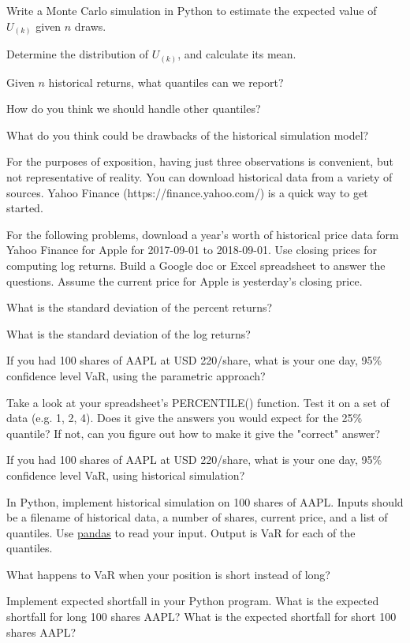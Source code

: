 \documentclass{report}
\numberwithin{problem}{chapter} %
\let\oldroblem\problem
\renewcommand{\problem}{ \oldroblem  \normalfont}
\newcommand{\vs}{\vspace}
\begin{document}
\problem Write a Monte Carlo simulation in Python to estimate the expected value of  $U_{(k)}$ given $n$ draws. 

\problem Determine the distribution of $U_{(k)}$, and calculate its mean. 

\problem Given $n$ historical returns, what quantiles can we report? 

\problem How do you think we should handle other quantiles?

\problem What do you think could be drawbacks of the historical simulation model?
\vs{3mm}

For the purposes of exposition, having just three observations is convenient, but not representative of reality. You can download historical data from a variety of sources. Yahoo Finance (https://finance.yahoo.com/) is a quick way to get started. 

For the following problems, download a year's worth of historical price data form Yahoo Finance for Apple for 2017-09-01 to 2018-09-01. Use closing prices for computing log returns.  Build a Google doc or Excel spreadsheet to answer the questions. Assume the current price for Apple is yesterday's closing price. 

\problem What is the standard deviation of the percent returns?

\problem What is the standard deviation of the log returns?

\problem If you had 100 shares of AAPL at USD 220/share, what is your one day, 95\% confidence level VaR, using the parametric approach?

\problem Take a look at your spreadsheet's PERCENTILE() function. Test it on a set of data (e.g. {1, 2, 4}). Does it give the answers you would expect for the 25\% quantile? If not, can you figure out how to make it give the "correct" answer?

\problem If you had 100 shares of AAPL at USD 220/share, what is your one day, 95\% confidence level VaR, using  historical simulation?

\problem In Python, implement historical simulation on 100 shares of AAPL. Inputs should be a filename of historical data, a number of shares, current price, and a list of quantiles. Use  \href{https://www.shanelynn.ie/python-pandas-read_csv-load-data-from-csv-files}{pandas} to read your input. Output is VaR for each of the quantiles. 

\problem What happens to VaR when your position is short instead of long?

\problem Implement \gls{expected shortfall} in your Python program. What is the expected shortfall for long 100 shares AAPL? What is the expected shortfall for short 100 shares AAPL? 
\end{document}
